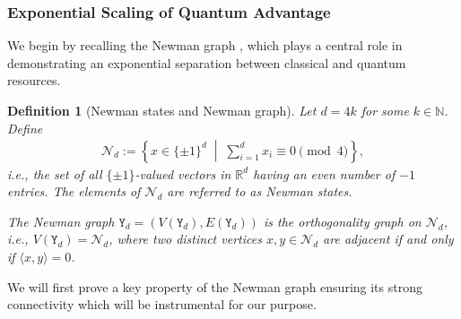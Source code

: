 \documentclass[12pt,a4paper]{article}
\newtheorem{definition}{Definition}
\begin{document}
\subsubsection{Exponential Scaling of Quantum Advantage}

We begin by recalling the Newman graph \cite{Newman}, which plays a central role in demonstrating an exponential separation between classical and quantum resources.

\begin{definition}[Newman states and Newman graph]
Let $d = 4k$ for some $k \in \mathbb{N}$. Define
\begin{align*}
\mathcal{N}_d := \left\{ x \in \{\pm 1\}^d \;\middle|\; \sum_{i=1}^d x_i \equiv 0 \pmod{4} \right\},
\end{align*}
i.e., the set of all $\{\pm 1\}$-valued vectors in $\mathbb{R}^d$ having an even number of $-1$ entries. The elements of $\mathcal{N}_d$ are referred to as \emph{Newman states}.

The \emph{Newman graph} $\mathtt{Y}_d=(V(\mathtt{Y}_d),E(\mathtt{Y}_d))$ is the orthogonality graph on $\mathcal{N}_d$, i.e., $V(\mathtt{Y}_d)=\mathcal{N}_d$, where two distinct vertices $x,y \in \mathcal{N}_d$ are adjacent if and only if $\langle x, y \rangle = 0$.
\end{definition}

\noindent We will first prove a key property of the Newman graph ensuring its strong connectivity which will be instrumental for our purpose.
\end{document}
